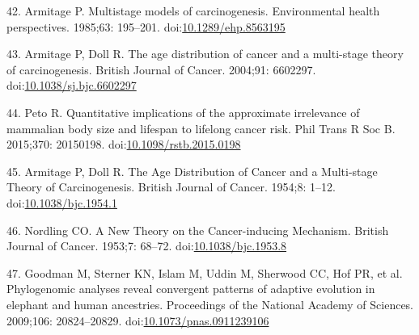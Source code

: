 \documentclass[]{elsarticle} %
\begin{document}
\leavevmode\hypertarget{ref-Armitage:19851c2}{}%
42. Armitage P. Multistage models of carcinogenesis. Environmental
health perspectives. 1985;63: 195--201.
doi:\href{https://doi.org/10.1289/ehp.8563195}{10.1289/ehp.8563195}

\leavevmode\hypertarget{ref-Armitage:20041c2}{}%
43. Armitage P, Doll R. The age distribution of cancer and a multi-stage
theory of carcinogenesis. British Journal of Cancer. 2004;91: 6602297.
doi:\href{https://doi.org/10.1038/sj.bjc.6602297}{10.1038/sj.bjc.6602297}

\leavevmode\hypertarget{ref-Peto:20151c2}{}%
44. Peto R. Quantitative implications of the approximate irrelevance of
mammalian body size and lifespan to lifelong cancer risk. Phil Trans R
Soc B. 2015;370: 20150198.
doi:\href{https://doi.org/10.1098/rstb.2015.0198}{10.1098/rstb.2015.0198}

\leavevmode\hypertarget{ref-ArmitageAndDoll1954}{}%
45. Armitage P, Doll R. The Age Distribution of Cancer and a Multi-stage
Theory of Carcinogenesis. British Journal of Cancer. 1954;8: 1--12.
doi:\href{https://doi.org/10.1038/bjc.1954.1}{10.1038/bjc.1954.1}

\leavevmode\hypertarget{ref-Nordling1953}{}%
46. Nordling CO. A New Theory on the Cancer-inducing Mechanism. British
Journal of Cancer. 1953;7: 68--72.
doi:\href{https://doi.org/10.1038/bjc.1953.8}{10.1038/bjc.1953.8}

\leavevmode\hypertarget{ref-Goodman2009}{}%
47. Goodman M, Sterner KN, Islam M, Uddin M, Sherwood CC, Hof PR, et al.
Phylogenomic analyses reveal convergent patterns of adaptive evolution
in elephant and human ancestries. Proceedings of the National Academy of
Sciences. 2009;106: 20824--20829.
doi:\href{https://doi.org/10.1073/pnas.0911239106}{10.1073/pnas.0911239106}
\end{document}
